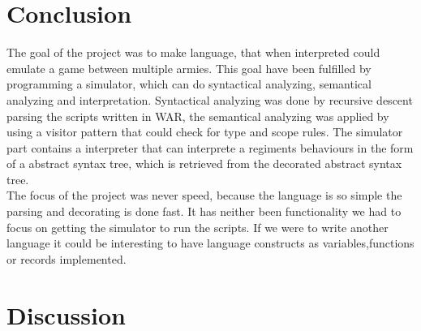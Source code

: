\section{Conclusion}
	The goal of the project was to make language, that when interpreted could emulate a game between multiple armies. 
	This goal have been fulfilled by programming a simulator, which can do syntactical analyzing, semantical analyzing and interpretation.
	Syntactical analyzing was done by recursive descent parsing the scripts written in WAR, the semantical analyzing was applied by using 
	a visitor pattern that could check for type and scope rules. The simulator part contains a interpreter that can interprete 
	a regiments behaviours in the form of a abstract syntax tree, which is retrieved from the decorated abstract syntax tree. \\
	
	The focus of the project was never speed, because the language is so simple the parsing and decorating is done fast.
	It has neither been functionality we had to focus on getting the simulator to run the scripts. If we were to write another language 
	it could be interesting to have language constructs as variables,functions or records implemented.
	 



\section{Discussion}